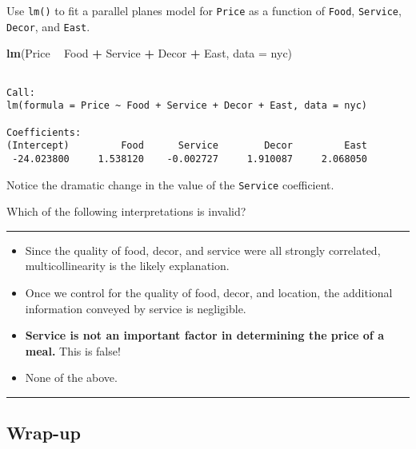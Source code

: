 \documentclass[
]{book}
\newenvironment{Shaded}{\begin{snugshade}}{\end{snugshade}}
\newcommand{\DataTypeTok}[1]{\textcolor[rgb]{0.13,0.29,0.53}{#1}}
\newcommand{\KeywordTok}[1]{\textcolor[rgb]{0.13,0.29,0.53}{\textbf{#1}}}
\newcommand{\NormalTok}[1]{#1}
\newcommand{\OperatorTok}[1]{\textcolor[rgb]{0.81,0.36,0.00}{\textbf{#1}}}
\newcommand{\StringTok}[1]{\textcolor[rgb]{0.31,0.60,0.02}{#1}}
\begin{document}
Use \texttt{lm()} to fit a parallel planes model for \texttt{Price} as a function of \texttt{Food}, \texttt{Service}, \texttt{Decor}, and \texttt{East}.

\begin{Shaded}
\begin{Highlighting}[]
\KeywordTok{lm}\NormalTok{(Price }\OperatorTok{~}\StringTok{ }\NormalTok{Food }\OperatorTok{+}\StringTok{ }\NormalTok{Service }\OperatorTok{+}\StringTok{ }\NormalTok{Decor }\OperatorTok{+}\StringTok{ }\NormalTok{East, }\DataTypeTok{data =}\NormalTok{ nyc)}
\end{Highlighting}
\end{Shaded}

\begin{verbatim}

Call:
lm(formula = Price ~ Food + Service + Decor + East, data = nyc)

Coefficients:
(Intercept)         Food      Service        Decor         East  
 -24.023800     1.538120    -0.002727     1.910087     2.068050  
\end{verbatim}

Notice the dramatic change in the value of the \texttt{Service} coefficient.

Which of the following interpretations is invalid?

\begin{center}\rule{0.5\linewidth}{0.5pt}\end{center}

\begin{itemize}
\item
  Since the quality of food, decor, and service were all strongly correlated, multicollinearity is the likely explanation.
\item
  Once we control for the quality of food, decor, and location, the additional information conveyed by service is negligible.
\item
  \textbf{Service is not an important factor in determining the price of a meal.} This is false!
\item
  None of the above.
\end{itemize}

\begin{center}\rule{0.5\linewidth}{0.5pt}\end{center}

\hypertarget{wrap-up}{%
\subsection*{Wrap-up}\label{wrap-up}}

  
\end{document}
